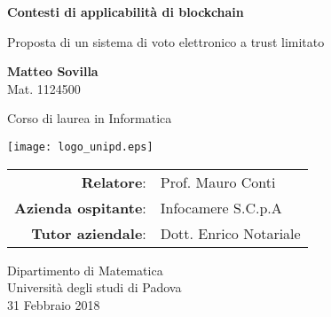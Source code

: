 \begin{titlepage}
    \begin{center}
        \vspace*{1cm}
        
        \Huge
        \textbf{Contesti di applicabilità di blockchain}
        
        \vspace{0.5cm}
        \large
        Proposta di un sistema di voto elettronico a trust limitato
        
        \vspace{1.5cm}
        
        \textbf{Matteo Sovilla} \\ Mat. 1124500
        
        \vspace{1cm}
        
        Corso di laurea in Informatica
        
        \vspace{0.8cm}
        
        \texttt{[image: logo\_unipd.eps]}

        \vspace{0.5cm}
        
        \vspace{0.5cm}
        
        \begin{center}
        	\begin{tabular}{ r l }
        		\textbf{Relatore}: & Prof. Mauro Conti \\
        		\textbf{Azienda ospitante}: & Infocamere S.C.p.A \\
        		\textbf{Tutor aziendale}: & Dott. Enrico Notariale \\
        	\end{tabular}
        \end{center}
        
        \vspace{0.5cm}
        
        \large
        Dipartimento di Matematica\\
        Università degli studi di Padova\\
        31 Febbraio 2018
        
    \end{center}
\end{titlepage}